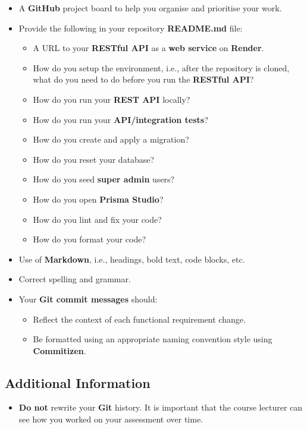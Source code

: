 \documentclass{article}
\begin{document}
\begin{itemize}
	\item A \textbf{GitHub} project board to help you organise and prioritise your work. 
	\item Provide the following in your repository \textbf{README.md} file:
	\begin{itemize}
		\item A URL to your \textbf{RESTful API} as a \textbf{web service} on \textbf{Render}.
		\item How do you setup the environment, i.e., after the repository is cloned, what do you need to do before you run the \textbf{RESTful API}?
		\item How do you run your \textbf{REST API} locally?
		\item How do you run your \textbf{API/integration tests}?
		\item How do you create and apply a migration?  
		\item How do you reset your database?
		\item How do you seed \textbf{super admin} users?
		\item How do you open \textbf{Prisma Studio}?
		\item How do you lint and fix your code?
		\item How do you format your code?
	\end{itemize}
	\item Use of \textbf{Markdown}, i.e., headings, bold text, code blocks, etc.
	\item Correct spelling and grammar. 
	\item Your \textbf{Git commit messages} should:
	\begin{itemize}
		\item Reflect the context of each functional requirement change.
		\item Be formatted using an appropriate naming convention style using \textbf{Commitizen}.
	\end{itemize}	
\end{itemize}

\subsection*{Additional Information}
\begin{itemize}
	\item \textbf{Do not} rewrite your \textbf{Git} history. It is important that the course lecturer can see how you worked on your assessment over time.
\end{itemize}
\end{document}
